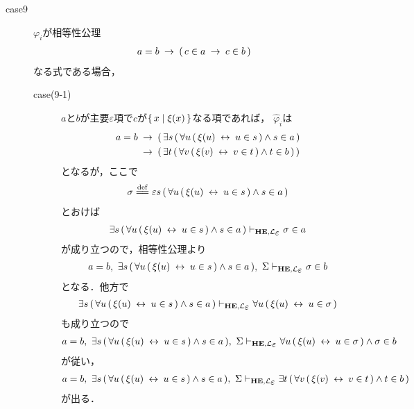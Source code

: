 \begin{metaprf}
\begin{description}
			\item[case9] $\varphi_{i}$が相等性公理
				\begin{align}
					a = b \hspace{0.25em}\rightarrow\hspace{0.25em} (\, c \in a \hspace{0.25em}\rightarrow\hspace{0.25em} c \in b\, )
				\end{align}
				なる式である場合，
				\begin{description}
					\item[case(9-1)] $a$と$b$が主要$\varepsilon$項で$c$が$\{\, x \mid \xi(x)\, \}$なる項であれば，
						$\widehat{\varphi}_{i}$は
						\begin{align}
							a = b &\hspace{0.25em}\rightarrow\hspace{0.25em} (\, \exists s\, (\, \forall u\, (\, \xi(u) \hspace{0.25em}\leftrightarrow\hspace{0.25em} u \in s\, ) \wedge s \in a\, ) \\
							&\hspace{0.25em}\rightarrow\hspace{0.25em} (\, \exists t\, (\, \forall v\, (\, \xi(v) \hspace{0.25em}\leftrightarrow\hspace{0.25em} v \in t\, ) \wedge t \in b\, )\, )
						\end{align}
						となるが，ここで
						\begin{align}
							\sigma \defeq \varepsilon s \, (\, \forall u\, (\, \xi(u) \lrarrow u \in s\, ) \wedge s \in a\, )
						\end{align}
						とおけば
						\begin{align}
							\exists s \, (\, \forall u\, (\, \xi(u) \lrarrow u \in s\, ) \wedge s \in a\, )
							\provable{\mbox{{\bf HE}},\lang{\varepsilon}} \sigma \in a
						\end{align}
						が成り立つので，相等性公理より
						\begin{align}
							a = b,\ \exists s \, (\, \forall u\, (\, \xi(u) \lrarrow u \in s\, ) \wedge s \in a\, ),\ \Sigma
							\provable{\mbox{{\bf HE}},\lang{\varepsilon}} \sigma \in b
						\end{align}
						となる．他方で
						\begin{align}
							\exists s \, (\, \forall u\, (\, \xi(u) \lrarrow u \in s\, ) \wedge s \in a\, )
							\provable{\mbox{{\bf HE}},\lang{\varepsilon}} \forall u\, (\, \xi(u) \lrarrow u \in \sigma\, ) 
						\end{align}
						も成り立つので
						\begin{align}
							a = b,\ \exists s \, (\, \forall u\, (\, \xi(u) \lrarrow u \in s\, ) \wedge s \in a\, ),\ \Sigma
							\provable{\mbox{{\bf HE}},\lang{\varepsilon}} \forall u\, (\, \xi(u) \lrarrow u \in \sigma\, ) \wedge \sigma \in b
						\end{align}
						が従い，
						\begin{align}
							a = b,\ \exists s \, (\, \forall u\, (\, \xi(u) \lrarrow u \in s\, ) \wedge s \in a\, ),\ \Sigma
							\provable{\mbox{{\bf HE}},\lang{\varepsilon}} \exists t\, (\, \forall v\, (\, \xi(v) \lrarrow v \in t\, ) \wedge t \in b\, )
						\end{align}
						が出る．
						

\end{description}
\end{description}
\end{metaprf}

